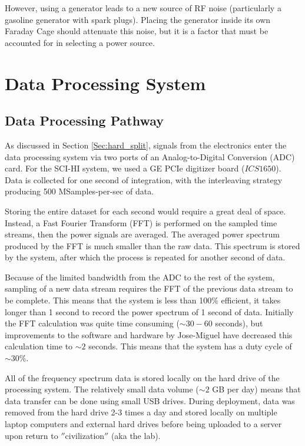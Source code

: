 However, using a generator leads to a new source of RF noise (particularly a gasoline generator with spark plugs). Placing the generator inside its own Faraday Cage should attenuate this noise, but it is a factor that must be accounted for in selecting a power source. 


\section{Data Processing System}


\subsection{Data Processing Pathway}

As discussed in Section \ref{Sec:hard_split}, signals from the electronics enter the data processing system via two ports of an Analog-to-Digital Conversion (ADC) card. For the SCI-HI system, we used a GE PCIe digitizer board ($ICS1650$). Data is collected for one second of integration, with the interleaving strategy producing 500 MSamples-per-sec of data. 

Storing the entire dataset for each second would require a great deal of space. Instead, a Fast Fourier Transform (FFT) is performed on the sampled time streams, then the power signals are averaged. The averaged power spectrum produced by the FFT is much smaller than the raw data. This spectrum is stored by the system, after which the process is repeated for another second of data. 

Because of the limited bandwidth from the ADC to the rest of the system, sampling of a new data stream requires the FFT of the previous data stream to be complete. This means that the system is less than 100\% efficient, it takes longer than 1 second to record the power spectrum of 1 second of data. Initially the FFT calculation was quite time consuming ($\sim 30-60$ seconds), but improvements to the software and hardware by Jose-Miguel have decreased this calculation time to $\sim 2$ seconds. This means that the system has a duty cycle of $\sim30$\%. 

All of the frequency spectrum data is stored locally on the hard drive of the processing system. The relatively small data volume ($\sim 2$ GB per day) means that data transfer can be done using small USB drives. During deployment, data was removed from the hard drive 2-3 times a day and stored locally on multiple laptop computers and external hard drives before being uploaded to a server upon return to $''$civilization$''$ (aka the lab). 

